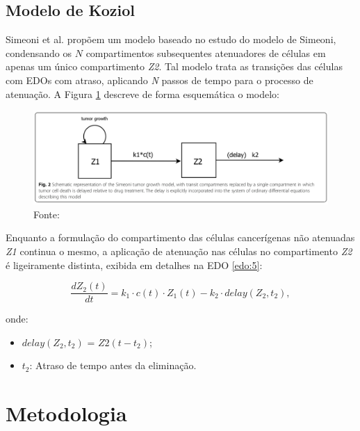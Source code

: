 \documentclass[12pt]{article}
\begin{document}
\subsection{Modelo de Koziol}

Simeoni et al. propõem um modelo baseado no estudo do modelo de Simeoni, condensando os \(N\) compartimentos subsequentes atenuadores de células em apenas um único compartimento \emph{Z2}. Tal modelo trata as transições das células com EDOs com atraso, aplicando \emph{N} passos de tempo para o processo de atenuação. A Figura \ref{fig:map2} descreve de forma esquemática o modelo:

\begin{figure}[H]
    \centering
    \includegraphics[width=1\textwidth]{pic/proposal.png}
    \hspace*{15pt}\hbox{\small Fonte:}\\
    \label{fig:map2}
\end{figure}

Enquanto a formulação do compartimento das células cancerígenas não atenuadas \emph{Z1} continua o mesmo, a aplicação de atenuação nas células no compartimento \emph{Z2} é ligeiramente distinta, exibida em detalhes na EDO \ref{edo:5}:

\begin{equation} \label{edo:5}
    \frac{dZ_2(t)}{dt} = k_1 \cdot c(t) \cdot Z_1(t) - k_2 \cdot delay(Z_2, t_2),
\end{equation}

onde:

\begin{itemize}
    \setlength{\itemsep}{10pt}
    \item \(delay(Z_2, t_2)\) = \(Z2(t - t_2)\);
    \item \(t_2\): Atraso de tempo antes da eliminação.
\end{itemize}

\section{Metodologia} \label{sec:3}
\end{document}

